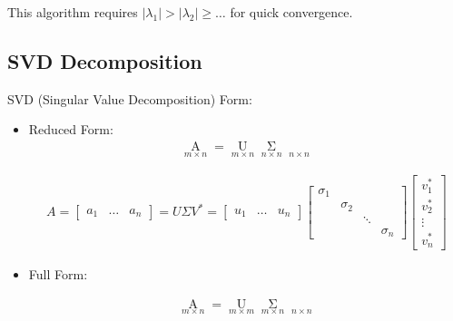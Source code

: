     This algorithm requires $ |\lambda _1|>|\lambda _2|\geq\ldots  $ for quick convergence.
    













\subsection{SVD Decomposition}
\begin{point}
    SVD (Singular Value Decomposition) Form:
\end{point}

    
\begin{itemize}[topsep=2pt,itemsep=0pt]
    \item Reduced Form:
\begin{align}
    \mathop{A}\limits_{m\times n} =\mathop{U}\limits_{m\times n}\mathop{\Sigma }\limits_{n\times n}\mathop{V^*}\limits_{n\times n}     
\end{align}

\begin{align}
    A=\begin{bmatrix}
        a_1&\ldots &a_n
    \end{bmatrix} 
    =U\Sigma V^*=
    \begin{bmatrix}
        u_1&\ldots&u_n
    \end{bmatrix}
    \begin{bmatrix}
        \sigma_1&&&\\
        &\sigma_2&&\\
        &&\ddots&\\
        &&&\sigma_n
    \end{bmatrix}
    \begin{bmatrix}
        v_1^*\\
        v_2^*\\
        \vdots\\
        v_n^*
    \end{bmatrix}
\end{align}
    \item Full Form:

    \begin{align}
        \mathop{A}\limits_{m\times n} =\mathop{U}\limits_{m\times m}\mathop{\Sigma }\limits_{m\times n}\mathop{V^*}\limits_{n\times n}     
    \end{align}
    

\end{itemize}
